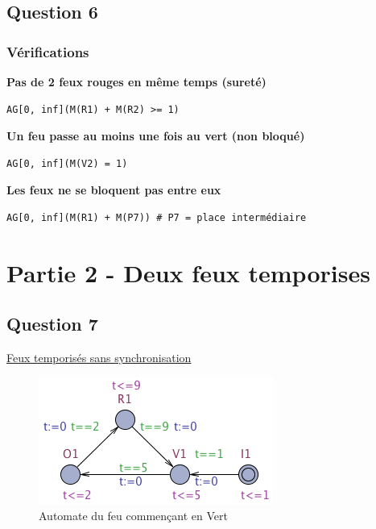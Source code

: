 \documentclass[11pt]{article}
\begin{document}
\subsection{Question 6}

\subsubsection{Vérifications}

\textbf{Pas de 2 feux rouges en même temps (sureté)}
\begin{verbatim}
AG[0, inf](M(R1) + M(R2) >= 1)	
\end{verbatim}

\textbf{Un feu passe au moins une fois au vert (non bloqué)}
\begin{verbatim}
AG[0, inf](M(V2) = 1)	
\end{verbatim}
	
\textbf{Les feux ne se bloquent pas entre eux}
\begin{verbatim}
AG[0, inf](M(R1) + M(P7)) # P7 = place intermédiaire	
\end{verbatim}

\section{Partie 2 - Deux feux temporises}

\subsection{Question 7}

\href{https://github.com/masters-info-nantes/hong-cheng-lv/blob/master/ressources/part2/Q7-FeuxTemporises.xml}{Feux temporisés sans synchronisation}

\begin{figure}[H]
	\centering
	\includegraphics{ressources/part2/Q7-1.png}
	\caption{Automate du feu commençant en Vert}
\end{figure}
\end{document}
